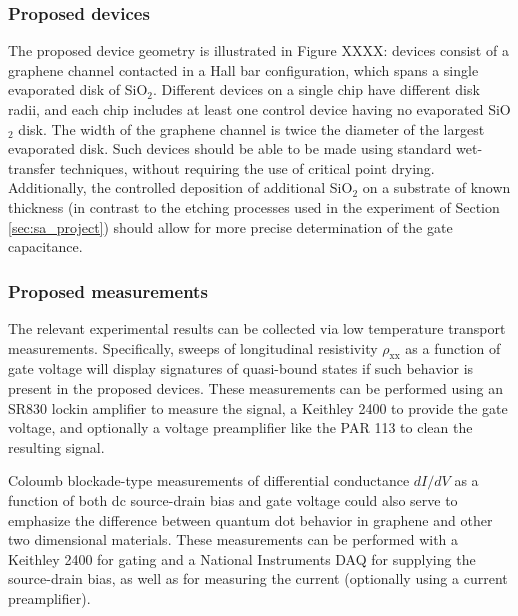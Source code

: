\documentclass[edeposit,fullpage,draftthesis]{uiucthesis2009}
\begin{document}
        \subsubsection*{Proposed devices}
        
            The proposed device geometry is illustrated in Figure XXXX: devices consist of 
            a graphene channel contacted in a Hall bar configuration, which
            spans a single evaporated disk of SiO$_2$. Different devices on a single chip
            have different disk radii, and each chip includes at least one control device
            having no evaporated SiO$_2$ disk. The width of the graphene channel is twice
            the diameter of the largest evaporated disk. Such devices should be able to
            be made using standard wet-transfer techniques, without requiring the use of
            critical point drying.
            Additionally, the controlled deposition of additional SiO$_2$ on a substrate of known thickness
            (in contrast to the etching processes used in the experiment of Section \ref{sec:sa_project})
            should allow for more precise determination of the gate capacitance.
        
        \subsubsection*{Proposed measurements}
        
            The relevant experimental results can be collected via low temperature transport
            measurements. Specifically, sweeps of longitudinal resistivity $\rho_\text{xx}$
            as a function of gate voltage will display signatures of 
            quasi-bound states if such behavior is present in the proposed devices. 
            These measurements can be performed using an SR830 lockin amplifier to measure the signal,
            a Keithley 2400 to provide the gate voltage, and optionally a voltage preamplifier
            like the PAR 113 to clean the resulting signal.
            
            Coloumb blockade-type measurements of differential conductance $dI/dV$ as a function of
            both dc source-drain bias and gate voltage could also serve to emphasize the difference
            between quantum dot behavior in graphene and other two dimensional materials. These 
            measurements can be performed with a Keithley 2400 for gating and a National Instruments DAQ
            for supplying the source-drain bias, as well as for measuring the current (optionally using
            a current preamplifier).
        
\end{document}
